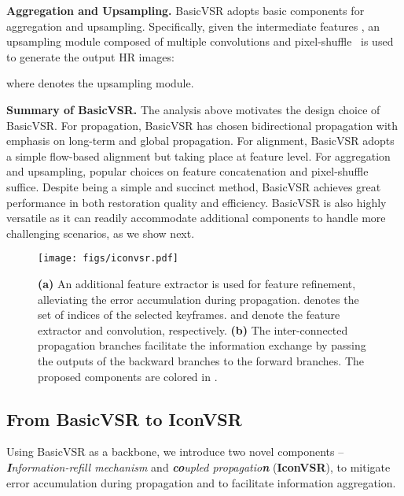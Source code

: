 \documentclass[final]{cvpr}
\begin{document}
\noindent\textbf{Aggregation and Upsampling.}
BasicVSR adopts basic components for aggregation and upsampling.
Specifically, given the intermediate features , an upsampling module composed of multiple convolutions and pixel-shuffle~\cite{shi2016real} is used to generate the output HR images:

where  denotes the upsampling module.

\vspace{0.15cm}
\noindent\textbf{Summary of \mbox{BasicVSR}.}
The analysis above motivates the design choice of \mbox{BasicVSR}. For propagation, BasicVSR has chosen bidirectional propagation with emphasis on long-term and global propagation. For alignment, BasicVSR adopts a simple flow-based alignment but  taking place at feature level. For aggregation and upsampling, popular choices on feature concatenation and pixel-shuffle suffice.
Despite being a simple and succinct method, \mbox{BasicVSR} achieves great performance in both restoration quality and efficiency. \mbox{BasicVSR} is also highly versatile as it can readily accommodate additional components to handle more challenging scenarios, as we show next.
\begin{figure}[!t]
	\begin{center}
		\texttt{[image: figs/iconvsr.pdf]}
		\caption{\textbf{(a)} An additional feature extractor is used for feature refinement, alleviating the error accumulation during propagation.  denotes the set of indices of the selected keyframes.  and  denote the feature extractor and convolution, respectively. \textbf{(b)} The inter-connected propagation branches facilitate the information exchange by passing the outputs of the backward branches to the forward branches. The proposed components are colored in \color{amethyst}{purple}.}
		\vspace{-0.5cm}
		\label{fig:iconvsr}
	\end{center}
\end{figure}
\subsection{From \mbox{BasicVSR} to \mbox{IconVSR}}
Using \mbox{BasicVSR} as a backbone, we introduce two novel components -- \textit{\textbf{I}nformation-refill mechanism} and \textit{\textbf{co}upled propagatio\textbf{n}} (\mbox{\textbf{IconVSR}}), to mitigate error accumulation during propagation and to facilitate information aggregation.
\vspace{0.15cm}
\end{document}
